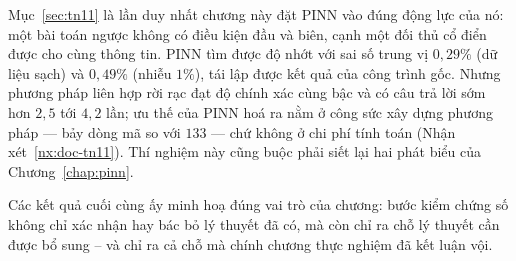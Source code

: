 Mục~\ref{sec:tn11} là lần duy nhất chương này đặt PINN vào đúng động lực của nó:
một bài toán ngược không có điều kiện đầu và biên, cạnh một đối thủ cổ điển được
cho cùng thông tin. PINN tìm được độ nhớt với sai số trung vị $0{,}29\%$ (dữ liệu
sạch) và $0{,}49\%$ (nhiễu $1\%$), tái lập được kết quả của công trình gốc. Nhưng
phương pháp liên hợp rời rạc đạt độ chính xác cùng bậc và có câu trả lời sớm hơn
$2{,}5$ tới $4{,}2$ lần; ưu thế của PINN hoá ra nằm ở công sức xây dựng phương pháp
--- bảy dòng mã so với $133$ --- chứ không ở chi phí tính toán
(Nhận xét~\ref{nx:doc-tn11}). Thí nghiệm này cũng buộc phải siết lại hai phát biểu
của Chương~\ref{chap:pinn}.

Các kết quả cuối cùng ấy minh hoạ đúng vai trò của chương: bước kiểm chứng số không
chỉ xác nhận hay bác bỏ lý thuyết đã có, mà còn chỉ ra chỗ lý thuyết cần được bổ
sung -- và chỉ ra cả chỗ mà chính chương thực nghiệm đã kết luận vội.
 
